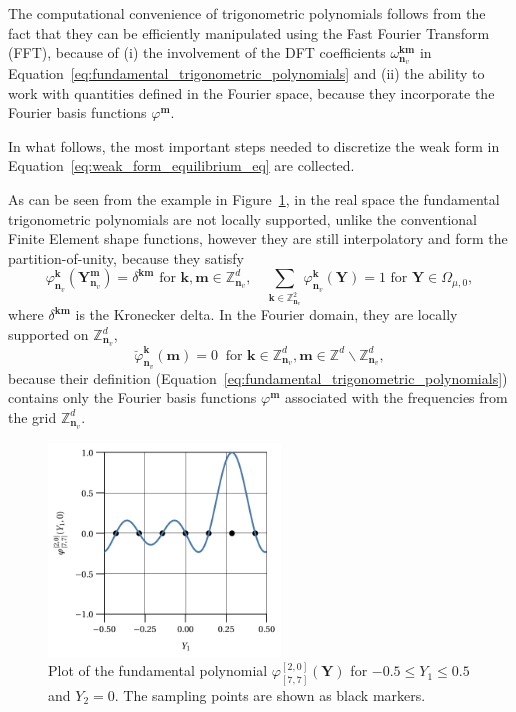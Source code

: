 The computational convenience of trigonometric polynomials follows from the fact that they can be efficiently manipulated using the Fast Fourier Transform (FFT), because of (i) the involvement of the DFT coefficients \(\omega_{\bm n_v}^{\bm  k\bm  m}\) in Equation~\eqref{eq:fundamental_trigonometric_polynomials} and (ii) the ability to work with quantities defined in the Fourier space, because they incorporate the Fourier basis functions \(\varphi^{\bm m}\).

In what follows, the most important steps needed to discretize the weak form in Equation~\eqref{eq:weak_form_equilibrium_eq} are collected.

As can be seen from the example in Figure~\ref{fig:example_fundamental_polynomial}, in the real space the fundamental trigonometric polynomials are not locally supported, unlike the conventional Finite Element shape functions, however they are still interpolatory and form the partition-of-unity, because they satisfy
\begin{equation} \label{eq:delta_property}
\varphi_{\bm n_v}^{\bm  k}\left(\bm   Y_{\bm n_v}^{\bm  m}\right)=\delta^{\bm  k \bm  m} \text { for } \bm  k, \bm  m \in \mathbb{Z}_{\bm n_v}^{d}, \quad \sum_{\bm  k \in \mathbb{Z}_{\bm n_v}^{2}} \varphi_{\bm n_v}^{\bm  k}(\bm Y)=1 \text { for } \bm Y \in \Omega_{\mu,0},
\end{equation}
where \(\delta^{\bm  k \bm  m}\) is the Kronecker delta.
In the Fourier domain, they are locally supported on \(\mathbb{Z}_{\bm n_v}^{d}\),
\begin{equation} \label{eq:basis_functions_compact_suppport}
\breve{\varphi}_{\bm n_v}^{\bm  k}(\bm{ m})=0\ \text { for } \bm{ k} \in \mathbb{Z}_{\bm n_v}^{d}, \bm  m \in \mathbb{Z}^{d} \backslash \mathbb{Z}_{\bm n_v}^{d},
\end{equation}
because their definition (Equation~\eqref{eq:fundamental_trigonometric_polynomials}) contains only the Fourier basis functions \(\varphi^{\bm  m}\) associated with the frequencies from the grid \(\mathbb{Z}_{\bm n_v}^{d}\).

\begin{figure}
  \centering
  \includegraphics[width=0.55\textwidth]{figures/fundamental_trig_pol}
  \caption{Plot of the fundamental polynomial \(\varphi_{[7,7]}^{[2,0]}(\bm Y)\) for \(-0.5\leq Y_1\leq 0.5\) and \(Y_2=0\). The sampling points are shown as black markers.}
\label{fig:example_fundamental_polynomial}
\end{figure}

